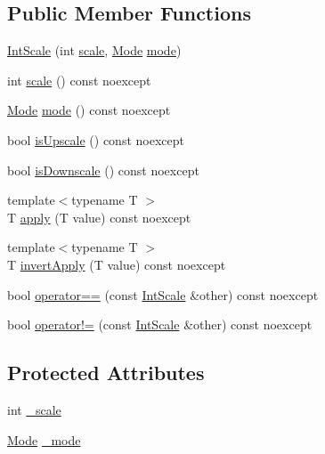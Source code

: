 \subsection*{Public Member Functions}
\begin{DoxyCompactItemize}
\item 
\hyperlink{struct_int_scale_aee812b511115dda01d34407d0576c8d4}{Int\-Scale} (int \hyperlink{struct_int_scale_acde6987ea678e2f5e4c94ee39047318f}{scale}, \hyperlink{struct_int_scale_ab7d4e812b60cd562ddc4fb120ff1f0cc}{Mode} \hyperlink{struct_int_scale_aa7bcbfec0954e48d295d9fcf1bbe58e0}{mode})
\item 
int \hyperlink{struct_int_scale_acde6987ea678e2f5e4c94ee39047318f}{scale} () const noexcept
\item 
\hyperlink{struct_int_scale_ab7d4e812b60cd562ddc4fb120ff1f0cc}{Mode} \hyperlink{struct_int_scale_aa7bcbfec0954e48d295d9fcf1bbe58e0}{mode} () const noexcept
\item 
bool \hyperlink{struct_int_scale_a8e29056cca4118d125a425a9380d9260}{is\-Upscale} () const noexcept
\item 
bool \hyperlink{struct_int_scale_af516c13864dcbf3e493d2a9e0fff1e01}{is\-Downscale} () const noexcept
\item 
{\footnotesize template$<$typename T $>$ }\\T \hyperlink{struct_int_scale_a00edcfc4c371f9afe30dcaaf1e50bc33}{apply} (T value) const noexcept
\item 
{\footnotesize template$<$typename T $>$ }\\T \hyperlink{struct_int_scale_a546cfc193c8f4319f892a5bf9fd0bd51}{invert\-Apply} (T value) const noexcept
\item 
bool \hyperlink{struct_int_scale_ac90865888b00e0512ceaf42b4be2f13a}{operator==} (const \hyperlink{struct_int_scale}{Int\-Scale} \&other) const noexcept
\item 
bool \hyperlink{struct_int_scale_a8324ea4d602b5ca0fc42df0b7407fb27}{operator!=} (const \hyperlink{struct_int_scale}{Int\-Scale} \&other) const noexcept
\end{DoxyCompactItemize}
\subsection*{Protected Attributes}
\begin{DoxyCompactItemize}
\item 
int \hyperlink{struct_int_scale_a7a6e2ffcdc9704a56b73c8d9abc5c483}{\-\_\-scale}
\item 
\hyperlink{struct_int_scale_ab7d4e812b60cd562ddc4fb120ff1f0cc}{Mode} \hyperlink{struct_int_scale_a767fd6ee9b544d8f465298d651c56468}{\-\_\-mode}
\end{DoxyCompactItemize}


